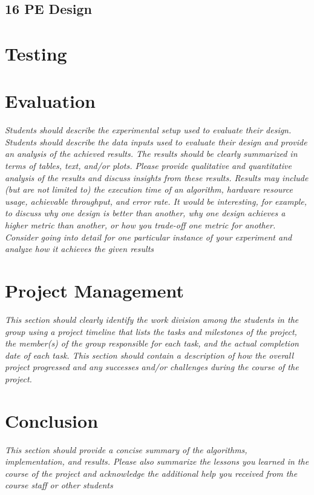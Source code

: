 \documentclass[10pt]{article}
\begin{document}
\subsection{16 PE Design}


\section{Testing}


\section{Evaluation}
\textit{Students should describe the experimental setup used to evaluate their design. Students
should describe the data inputs used to evaluate their design and provide an analysis of the achieved
results. The results should be clearly summarized in terms of tables, text, and/or plots. Please provide
qualitative and quantitative analysis of the results and discuss insights from these results. Results may
include (but are not limited to) the execution time of an algorithm, hardware resource usage, achievable
throughput, and error rate. It would be interesting, for example, to discuss why one design is better
than another, why one design achieves a higher metric than another, or how you trade-off one metric
for another. Consider going into detail for one particular instance of your experiment and analyze how
it achieves the given results}


\section{Project Management}
\textit{This section should clearly identify the work division among the students in
the group using a project timeline that lists the tasks and milestones of the project, the member(s) of
the group responsible for each task, and the actual completion date of each task. This section should
contain a description of how the overall project progressed and any successes and/or challenges during
the course of the project.}

\section{Conclusion}

\textit{This section should provide a concise summary of the algorithms, implementation, and results. Please also summarize the lessons you learned in the course of
the project and acknowledge the additional help you received from the course staff or other students}
\end{document}

